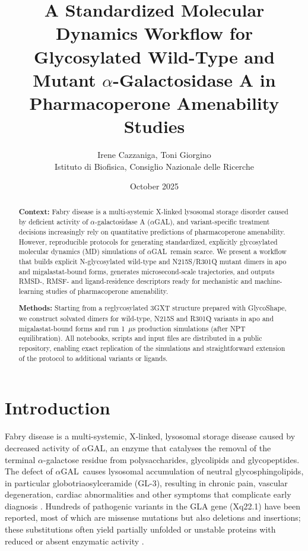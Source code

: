 \documentclass{article}
\newcommand{\agal}{$\alpha$GAL}
\begin{document}
\title{A Standardized Molecular Dynamics Workflow for Glycosylated Wild-Type and Mutant $\alpha$-Galactosidase A in Pharmacoperone Amenability Studies}

\author{Irene Cazzaniga, Toni Giorgino \\[5mm]
Istituto di Biofisica, Consiglio Nazionale delle Ricerche}

\date{October 2025}

\maketitle

\begin{abstract}
\textbf{Context:}
Fabry disease is a multi-systemic X-linked lysosomal storage disorder caused by deficient activity of $\alpha$-galactosidase A (\agal), and variant-specific treatment decisions increasingly rely on quantitative predictions of pharmacoperone amenability.
However, reproducible protocols for generating standardized, explicitly glycosylated molecular dynamics (MD) simulations of \agal\ remain scarce.
We present a workflow that builds explicit N-glycosylated wild-type and N215S/R301Q mutant dimers in apo and migalastat-bound forms, generates microsecond-scale trajectories, and outputs RMSD-, RMSF- and ligand-residence descriptors ready for mechanistic and machine-learning studies of pharmacoperone amenability.

\textbf{Methods:}
Starting from a reglycosylated 3GXT structure prepared with GlycoShape, we construct solvated dimers for wild-type, N215S and R301Q variants in apo and migalastat-bound forms and run 1~$\mu$s production simulations (after NPT equilibration).
All notebooks, scripts and input files are distributed in a public repository, enabling exact replication of the simulations and straightforward extension of the protocol to additional variants or ligands.
\end{abstract}

\section{Introduction}

Fabry disease is a multi-systemic, X-linked, lysosomal storage disease caused by decreased activity of \agal, an enzyme that catalyses the removal of the terminal $\alpha$-galactose residue from polysaccharides, glycolipids and glycopeptides.
The defect of \agal\ causes lysosomal accumulation of neutral glycosphingolipids, in particular globotriaosylceramide (GL-3), resulting in chronic pain, vascular degeneration, cardiac abnormalities and other symptoms that complicate early diagnosis \cite{sugawara_structural_2008}.
Hundreds of pathogenic variants in the GLA gene (Xq22.1) have been reported, most of which are missense mutations but also deletions and insertions; these substitutions often yield partially unfolded or unstable proteins with reduced or absent enzymatic activity \cite{matsuzawa_fabry_2005}.
\end{document}
